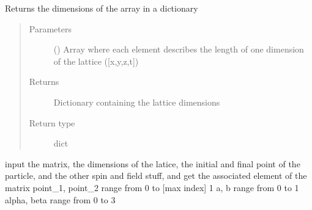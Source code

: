 \documentclass[letterpaper,10pt,english]{sphinxmanual}
\begin{document}
\begin{fulllineitems}
\label{\detokenize{index:su2.dim}}
Returns the dimensions of the array in a dictionary
\begin{quote}\begin{description}
\item[{Parameters}] \leavevmode
{} () \textendash{} Array where each element describes the length of one
dimension of the lattice ({[}x,y,z,t{]})

\item[{Returns}] \leavevmode
Dictionary containing the lattice dimensions

\item[{Return type}] \leavevmode
dict

\end{description}\end{quote}

\end{fulllineitems}


\begin{fulllineitems}
\label{\detokenize{index:su2.getElement}}
input the matrix, the dimensions of the latice, the initial and final point of the particle,
and the other spin and field stuff, and get the associated element of the matrix
point\_1, point\_2 range from 0 to {[}max index{]} \sphinxhyphen{} 1
a, b range from 0 to 1
alpha, beta range from 0 to 3

\end{fulllineitems}

\end{document}
